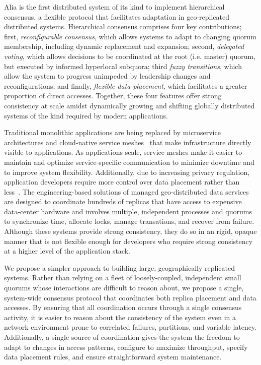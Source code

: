 \documentclass[11pt,conference]{IEEEtran}
\begin{document}
Alia is the first distributed system of its kind to implement hierarchical consensus,
a flexible protocol that facilitates adaptation in geo-replicated distributed systems.
Hierarchical consensus comprises four key contributions; first, \emph{reconfigurable
consensus}, which allows systems to adapt to changing quorum membership, including
dynamic replacement and expansion; second, \emph{delegated voting}, which allows
decisions to be coordinated at the root (i.e. master) quorum, but executed by informed
hyperlocal subquora; third \emph{fuzzy transitions}, which allow the system to progress
unimpeded by leadership changes and reconfigurations; and finally, \emph{flexible data
placement}, which facilitates a greater proportion of direct accesses.
Together, these four features offer strong consistency at scale amidst dynamically
growing and shifting globally distributed systems of the kind required by modern
applications.

Traditional monolithic applications are being replaced by microservice
architectures and cloud-native service meshes~\cite{envoy} that make
infrastructure directly visible to applications.
As applications scale, service meshes make it easier to maintain and optimize
service-specific communication to minimize downtime and to improve system flexibility.
Additionally, due to increasing privacy regulation, application developers require more
control over data placement rather than less~\cite{gdpr}.
The engineering-based solutions of managed geo-distributed data services are designed to
coordinate hundreds of replicas that have access to expensive data-center hardware and
involves multiple, independent processes and quorums to synchronize time, allocate locks,
manage transations, and recover from failure.
Although these systems provide strong consistency, they do so in an rigid, opaque manner
that is not flexible enough for developers who require strong consistency at a higher
level of the application stack.

We propose a simpler approach to building large, geographically replicated systems.
Rather than relying on a fleet of loosely-coupled, independent small quorums whose
interactions are difficult to reason about, we propose a single, system-wide consensus
protocol that coordinates both replica placement and data accesses.
By ensuring that all coordination occurs through a single consensus activity,
it is easier to reason about the consistency of the system even in a network environment
prone to correlated failures, partitions, and variable latency.
Additionally, a single source of coordination gives the system the freedom to adapt to
changes in access patterns, configure to maximize throughput, specify data placement
rules, and ensure straightforward system maintenance.
\end{document}
